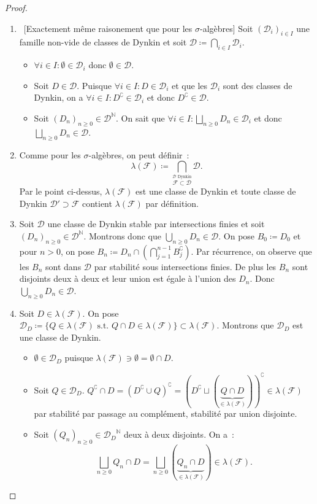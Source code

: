 \documentclass{article}
\newcommand{\st}{\text{ s.t. }}
\newcommand{\C}{\complement}
\newcommand{\N}{{\mathbb N}}
\begin{document}
\begin{proof}~
\begin{enumerate}
	\item~[Exactement même raisonement que pour les $\sigma$-algèbres] Soit $(\mathcal D_i)_{i \in I}$ une famille non-vide de classes de Dynkin et soit
	$\mathcal D \coloneqq \bigcap_{i \in I}\mathcal D_i$.

	\begin{itemize}
		\item $\forall i \in I : \emptyset \in \mathcal D_i$ donc $\emptyset \in \mathcal D$.
		\item Soit $D \in \mathcal D$. Puisque $\forall i \in I : D \in \mathcal D_i$ et que les $\mathcal D_i$ sont des classes de Dynkin, on a $\forall i \in I : D^\C \in \mathcal D_i$
		et donc $D^\C \in \mathcal D$.
		\item Soit $(D_n)_{n \geq 0} \in \mathcal D^\N$. On sait que $\forall i \in I : \bigsqcup_{n \geq 0}D_n \in \mathcal D_i$ et donc $\bigsqcup_{n \geq 0}D_n \in \mathcal D$.
	\end{itemize}

	\item Comme pour les $\sigma$-algèbres, on peut définir~:
	\[\lambda(\mathcal F) \coloneqq \bigcap_{\overset{\mathcal D \text{ Dynkin}}{\mathcal F \subset \mathcal D}}\mathcal D.\]
	Par le point ci-dessus, $\lambda(\mathcal F)$ est une classe de Dynkin et toute classe de Dynkin $\mathcal D' \supset \mathcal F$ contient $\lambda(\mathcal F)$ par définition.

	\item Soit $\mathcal D$ une classe de Dynkin stable par intersections finies et soit $(D_n)_{n \geq 0} \in \mathcal D^\N$. Montrons donc que $\bigcup_{n \geq 0}D_n \in \mathcal D$.
	On pose $B_0 \coloneqq D_0$ et pour $n > 0$, on pose $B_n \coloneqq D_n \cap (\bigcap_{j=1}^{n-1}B_j^\C)$. Par récurrence, on observe que les $B_n$ sont dans $\mathcal D$ par
	stabilité sous intersections finies. De plus les $B_n$ sont disjoints deux à deux et leur union est égale à l'union des $D_n$. Donc $\bigcup_{n \geq 0}D_n \in \mathcal D$.

	\item Soit $D \in \lambda(\mathcal F)$. On pose $\mathcal D_D \coloneqq \{Q \in \lambda(\mathcal F) \st Q \cap D \in \lambda(\mathcal F)\} \subset \lambda(\mathcal F)$.
	Montrons que $\mathcal D_D$ est une classe de Dynkin.
	\begin{itemize}
		\item $\emptyset \in \mathcal D_D$ puisque $\lambda(\mathcal F) \ni \emptyset = \emptyset \cap D$.
		\item Soit $Q \in \mathcal D_D$. $Q^\C \cap D = (D^\C \cup Q)^\C = (D^\C \sqcup (\underbrace {Q \cap D}_{\in \lambda(\mathcal F)}))^\C \in \lambda(\mathcal F)$ par
		stabilité par passage au complément, stabilité par union disjointe.
		\item Soit $(Q_n)_{n \geq 0} \in {\mathcal D_D}^\N$ deux à deux disjoints. On a~:
		\[\bigsqcup_{n \geq 0}Q_n \cap D = \bigsqcup_{n \geq 0}(\underbrace {Q_n \cap D}_{\in \lambda(\mathcal F)}) \in \lambda(\mathcal F).\]
	\end{itemize}


\end{enumerate}
\end{proof}
\end{document}
